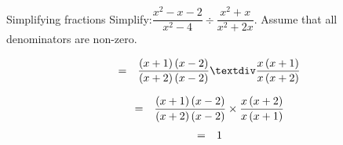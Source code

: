 \begin{wex}{Simplifying fractions }
{Simplify:$\dfrac{{x}^{2}-x-2}{{x}^{2}-4}÷\dfrac{{x}^{2}+x}{{x}^{2}+2x}$. Assume that all denominators are non-zero.} {
\begin{equation*}
\begin{array}{ccc}& =& \dfrac{\left(x+1\right)\left(x-2\right)}{\left(x+2\right)\left(x-2\right)}÷\dfrac{x\left(x+1\right)}{x\left(x+2\right)}\hfill \end{array}
\end{equation*}


\begin{equation*}
\begin{array}{ccc}& =& \dfrac{\left(x+1\right)\left(x-2\right)}{\left(x+2\right)\left(x-2\right)}\ensuremath{\times}\dfrac{x\left(x+2\right)}{x\left(x+1\right)}\hfill \end{array}
\end{equation*}
\begin{equation*}
\begin{array}{ccc}& =& 1\hfill \end{array}
\end{equation*}
}
\end{wex}


